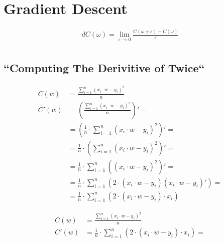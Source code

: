 \documentclass{article}
\begin{document}
\section{Gradient Descent}

\begin{align}
dC(\omega) = \lim_{\varepsilon\to 0}\frac{C(\omega + \varepsilon) - C(\omega)}{\varepsilon} \\
\end{align}

\subsection{``Computing The Derivitive of Twice``}

\begin{align}
    C(w)  &= \frac{\sum_{i=1}^{n}(x_i \cdot w - y_i)^2}{n} \\
    C'(w) &= \left(\frac{\sum_{i=1}^{n}(x_i \cdot w - y_i)^2}{n}\right)' = \\
          &= \left(\frac{1}{n} \cdot \sum_{i=1}^{n}(x_i \cdot w - y_i)^2 \right)' = \\ 
          &= \frac{1}{n} \cdot \left(\sum_{i=1}^{n}(x_i \cdot w - y_i)^2 \right)' = \\ 
          &= \frac{1}{n} \cdot \sum_{i=1}^{n}\left( (x_i \cdot w - y_i)^2 \right)' = \\ 
          &= \frac{1}{n} \cdot \sum_{i=1}^{n}\left( 2 \cdot (x_i \cdot w - y_i) (x_i \cdot w - y_i)' \right) = \\ 
          &= \frac{1}{n} \cdot \sum_{i=1}^{n}\left( 2 \cdot (x_i \cdot w - y_i) \cdot x_i \right) 
\end{align}


\begin{align}
    C(w)  &= \frac{\sum_{i=1}^{n}(x_i \cdot w - y_i)^2}{n} \\
    C'(w) &= \frac{1}{n} \cdot \sum_{i=1}^{n} \left( 2 \cdot (x_i \cdot w - y_i) \cdot x_i \right) = \\ 
\end{align}
\end{document}
